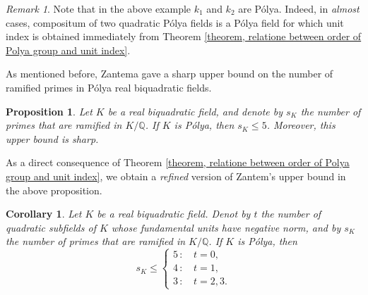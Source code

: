 \documentclass{jams-l}
\newtheorem{corollary}[theorem]{Corollary}
\newtheorem{proposition}[theorem]{Proposition}
\theoremstyle{definition}
\theoremstyle{remark}
\newtheorem{remark}[theorem]{Remark}
\numberwithin{equation}{section}
\begin{document}
\begin{remark}
 Note that in the above example $k_1$ and $k_2$ are P\'olya. Indeed, in \textit{almost} cases, compositum of two  quadratic P\'olya fields is a P\'olya field  \cite[$\S$ 5]{Leriche 2013} for which unit index is obtained immediately from
  Theorem \eqref{theorem, relatione between order of Polya group and unit index}.
\end{remark}




As mentioned before, Zantema \cite{Zantema} gave a sharp upper bound on the number of ramified primes in P\'olya real biquadratic fields.

\begin{proposition} \cite[Section 5]{Zantema}
Let $K$ be a real biquadratic field, and denote by $s_K$ the number of primes that are ramified in $K/\mathbb{Q}$. If $K$ is P\'olya, then $s_K \leq 5$. Moreover, this upper bound is sharp. 
\end{proposition}

As a direct consequence of Theorem \ref{theorem, relatione between order of Polya group and unit index}, we obtain a \emph{refined} version of Zantem's upper bound in the above proposition.




\begin{corollary} \label{corollary, improving Zantema upper bound for Polya biquadratic fields}
	Let
$K$ be a real biquadratic field. Denot by $t$ the number of quadratic subfields of $K$ whose fundamental units have negative norm, and by $s_K$ the number of primes that are ramified in $K/\mathbb{Q}$. If $K$ is P\'olya, then
\begin{equation*}
s_K \leq \left\{
\begin{array}{rl}
5 \, :& \, t=0, \\
 4 \, :& \,   t=1, \\
 3 \, :& \,  t=2,3.
\end{array} \right.
\end{equation*}
\end{corollary}
\end{document}
